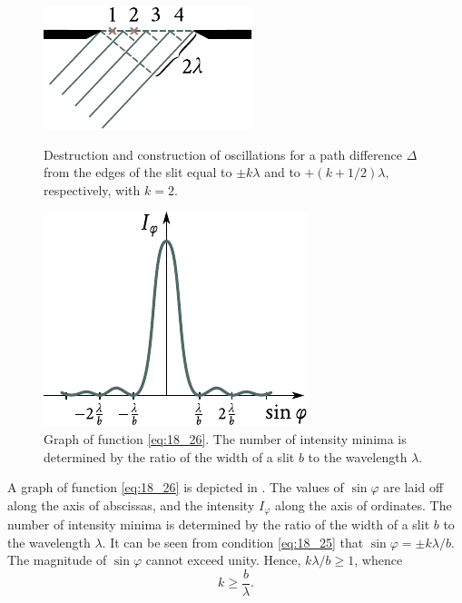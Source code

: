 \begin{figure}[t]
	\begin{minipage}[t]{0.48\linewidth}
		\begin{center}
			\includegraphics[scale=1]{figures/ch_18/fig_18_27.pdf}
            \caption[]{Destruction and construction of oscillations for a path difference $\Delta$ from the edges of the slit equal to $\pm k\lambda$ and to $+(k+1/2)\lambda$, respectively, with $k=2$.}
			\label{fig:18_27}
		\end{center}
	\end{minipage}
	\hfill{ }%
	\begin{minipage}[t]{0.48\linewidth}
		\begin{center}
			\includegraphics[scale=1]{figures/ch_18/fig_18_28.pdf}
			\caption[]{Graph of function \eqref{eq:18_26}. The number of intensity minima is determined by the ratio of the width of a slit $b$ to the wavelength $\lambda$.}
			\label{fig:18_28}
		\end{center}
	\end{minipage}
\vspace{-0.4cm}
\end{figure}

A graph of function \eqref{eq:18_26} is depicted in .
The values of $\sin\varphi$ are laid off along the axis of abscissas, and the intensity $I_{\varphi}$
along the axis of ordinates.
The number of intensity minima is determined by the ratio of the width of a slit $b$ to the wavelength $\lambda$.
It can be seen from condition \eqref{eq:18_25} that $\sin\varphi=\pm k\lambda/b$.
The magnitude of $\sin\varphi$ cannot exceed unity.
Hence, $k\lambda/b\geqslant 1$, whence
\begin{equation}\label{eq:18_27}
	k \geqslant \frac{b}{\lambda}.
\end{equation}

